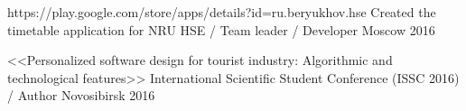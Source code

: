 \begin{cventries}
\cventry
{https://play.google.com/store/apps/details?id=ru.beryukhov.hse} %
{Created the timetable application for NRU HSE / Team leader / Developer} %
{Moscow} %
{2016} %
{}









\cventry
{<<Personalized software design for tourist industry: Algorithmic and technological features>>} %
{International Scientific Student Conference (ISSC 2016) / Author} %
{Novosibirsk} %
{2016} %
{}




\end{cventries}
